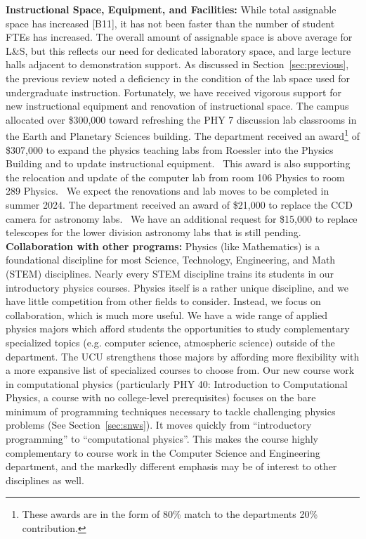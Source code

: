 \documentclass[12pt]{article}
\begin{document}
\noindent
{\bf Instructional Space, Equipment, and Facilities:} While total
assignable space has increased [B11], it has not been faster than the
number of student FTEs has increased.  The overall amount of assignable
space is above average for L\&S, but this reflects our need for
dedicated laboratory space, and large lecture halls adjacent to
demonstration support.  As discussed in Section~\ref{sec:previous},
the previous review noted a deficiency in the condition of the lab
space used for undergraduate instruction.  Fortunately, we have
received vigorous support for new instructional equipment and renovation of instructional space.  The campus allocated over \$300,000 toward refreshing the PHY 7 discussion lab classrooms in the Earth and Planetary Sciences building.  The department received an award\footnote{These awards are in the form of 80\% match to the departments 20\% contribution.} of \$307,000 to expand the physics teaching labs from Roessler into the Physics Building and to update instructional equipment.  This award is also supporting the relocation and update of the computer lab from room 106 Physics to room 289 Physics.  We expect the renovations and lab moves to be completed in summer 2024.  The department received an award of \$21,000 to replace the CCD camera for astronomy labs.  We have an additional request for \$15,000 to replace telescopes for the lower division astronomy labs that is still pending.\\[3pt]

\noindent
{\bf Collaboration with other programs: } Physics (like Mathematics)
is a foundational discipline for most Science, Technology,
Engineering, and Math (STEM) disciplines.  Nearly every STEM
discipline trains its students in our introductory physics courses.
Physics itself is a rather unique discipline, and we have little
competition from other fields to consider.  Instead, we focus on
collaboration, which is much more useful.  We have a wide range of
applied physics majors which afford students the opportunities to
study complementary specialized topics (e.g. computer science,
atmospheric science) outside of the department.  The UCU strengthens
those majors by affording more flexibility with a more expansive list
of specialized courses to choose from.  Our new course work in
computational physics (particularly PHY 40: Introduction to
Computational Physics, a course with no college-level prerequisites)
focuses on the bare minimum of programming techniques necessary to
tackle challenging physics problems (See Section~\ref{sec:snws}).  It
moves quickly from ``introductory programming'' to ``computational
physics''.  This makes the course highly complementary to course work
in the Computer Science and Engineering department, and the markedly
different emphasis may be of interest to other disciplines as
well.\\[3pt]
\end{document}
